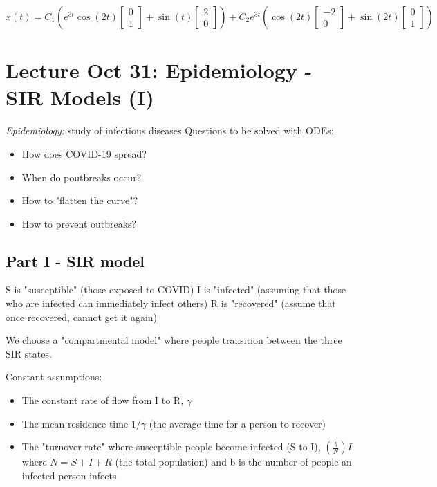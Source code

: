 \documentclass[12pt]{article}
\begin{document}
\[x(t) = C_1 \left(e^{3t} \cos (2t) \begin{bmatrix}
    0\\1
\end{bmatrix} + \sin(t) \begin{bmatrix}
    2\\0
\end{bmatrix}\right) + C_2 e^{3t} \left(\cos(2t) \begin{bmatrix}
    -2\\
    0
\end{bmatrix} + \sin (2t) \begin{bmatrix}
    0\\1
\end{bmatrix}\right)\]

\section{Lecture Oct 31: Epidemiology - SIR Models (I)}
\emph{Epidemiology:} study of infectious diseases 
Questions to be solved with ODEs;
\begin{itemize}
    \item How does COVID-19 spread?
    \item When do poutbreaks occur?
    \item How to "flatten the curve"?
    \item How to prevent outbreaks?
\end{itemize}

\subsection*{Part I - SIR model}
S is "susceptible" (those exposed to COVID)
I is "infected" (assuming that those who are infected can immediately infect others)
R is "recovered" (assume that once recovered, cannot get it again)

We choose a "compartmental model" where people transition between the three SIR states.

Constant assumptions:
\begin{itemize}
    \item The constant rate of flow from I to R, $\gamma$
    \item The mean residence time $1/ \gamma$ (the average time for a person to recover)
    \item The "turnover rate" where susceptible people become infected (S to I), $\left(\frac{b}{N}\right) I$
        where $N = S + I + R$ (the total population) and b is the number of people an infected person infects
\end{itemize}
\end{document}
